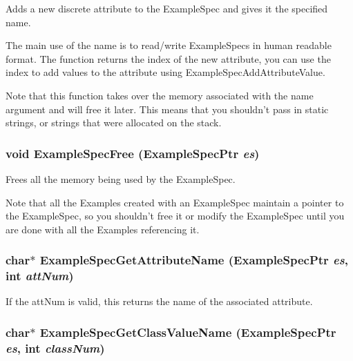 Adds a new discrete attribute to the Example\-Spec and gives it the specified name. 

The main use of the name is to read/write Example\-Specs in human readable format. The function returns the index of the new attribute, you can use the index to add values to the attribute using Example\-Spec\-Add\-Attribute\-Value.

Note that this function takes over the memory associated with the name argument and will free it later. This means that you shouldn't pass in static strings, or strings that were allocated on the stack. 
\subsubsection{\setlength{\rightskip}{0pt plus 5cm}void Example\-Spec\-Free ({\bf Example\-Spec\-Ptr} {\em es})}\label{ExampleSpec_8h_a25}


Frees all the memory being used by the Example\-Spec. 

Note that all the Examples created with an Example\-Spec maintain a pointer to the Example\-Spec, so you shouldn't free it or modify the Example\-Spec until you are done with all the Examples referencing it. 
\subsubsection{\setlength{\rightskip}{0pt plus 5cm}char$\ast$ Example\-Spec\-Get\-Attribute\-Name ({\bf Example\-Spec\-Ptr} {\em es}, int {\em att\-Num})}\label{ExampleSpec_8h_a38}


If the att\-Num is valid, this returns the name of the associated attribute. 

\subsubsection{\setlength{\rightskip}{0pt plus 5cm}char$\ast$ Example\-Spec\-Get\-Class\-Value\-Name ({\bf Example\-Spec\-Ptr} {\em es}, int {\em class\-Num})}\label{ExampleSpec_8h_a42}


